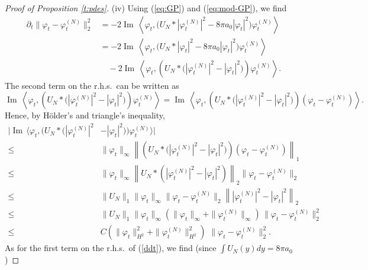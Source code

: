 \documentclass[11pt,a4paper]{article}
\renewcommand{\Im}{\operatorname{Im}\,} 	%
\begin{document}
\begin{proof}[Proof of Proposition \ref{t:pdes}]
(iv) Using (\ref{eq:GP}) and (\ref{eq:mod-GP}), we find
\begin{equation}\label{ddt}
    \begin{aligned}
      \partial_t \| \varphi_t - \varphi_t^{(N)} \|_{2}^2 & = -2 \Im \left\langle
      \varphi_t, \big(U_N * |\varphi_t^{(N)}|^2 - 8 \pi a_0 |\varphi_t|^2\big)
      \varphi_t^{(N)} \right\rangle \\
      & = - 2 \Im \left\langle \varphi_t, \big(U_N * |\varphi_t|^2 - 8 \pi a_0
      |\varphi_t|^2\big) \varphi_t^{(N)} \right\rangle \\
      & \quad - 2 \Im \left\langle \varphi_t, \left( U_N * \big(|\varphi_t^{(N)}|^2 -
      |\varphi_t|^2\big) \right) \varphi_t^{(N)} \right\rangle.
    \end{aligned}
  \end{equation}
The second term on the r.h.s.\ can be written as
\[  \Im \left\langle \varphi_t, \left( U_N * \big(|\varphi_t^{(N)}|^2 -
      |\varphi_t|^2\big) \right) \varphi_t^{(N)} \right\rangle = \Im \left\langle \varphi_t, \left( U_N * \big(|\varphi_t^{(N)}|^2 -  |\varphi_t|^2\big) \right) (\varphi_t - \varphi_t^{(N)}) \right\rangle. \]
 Hence, by H\"older's and triangle's inequality, 
\begin{equation}\label{ddt-2} \begin{split} 
\Big|  \Im \Big\langle \varphi_t, \Big( U_N * \big(|\varphi_t^{(N)}|^2 &-
      |\varphi_t|^2\big) \Big) \varphi_t^{(N)} \Big\rangle \Big| \\ \leq \; & \| \varphi_t \|_\infty \left\| \left( U_N * \big(|\varphi_t^{(N)}|^2 -  |\varphi_t|^2\big) \right) (\varphi_t - \varphi_t^{(N)}) \right\|_1 \\ \leq \; & 
  \| \varphi_t \|_\infty  \left\| U_N * (|\varphi_t^{(N)}|^2 - |\varphi_t|^2 )\right\|_2 \| \varphi_t - \varphi_t^{(N)} \|_2 \\ \leq \; & \| U_N \|_1 \| \varphi_t \|_\infty \| \varphi_t - \varphi_t^{(N)} \|_2  \left\| |\varphi_t^{(N)}|^2 - |\varphi_t|^2 \right\|_2 \\ \leq \; &  \| U_N \|_1 \| \varphi_t \|_\infty \left( \| \varphi_t \|_\infty + \| \varphi_t^{(N)} \|_\infty \right) \,  \| \varphi_t - \varphi_t^{(N)} \|^2_2 \\ \leq \; & C  \left( \| \varphi_t \|^2_{H^2} + \| \varphi_t^{(N)}  \|^2_{H^2}  \right) \, \,  \| \varphi_t - \varphi_t^{(N)} \|^2_2.
\end{split} \end{equation}
As for the first term on the r.h.s.\ of (\ref{ddt}), we find (since $\int U_N (y) dy = 8 \pi a_0$) 

\end{proof}
\end{document}
